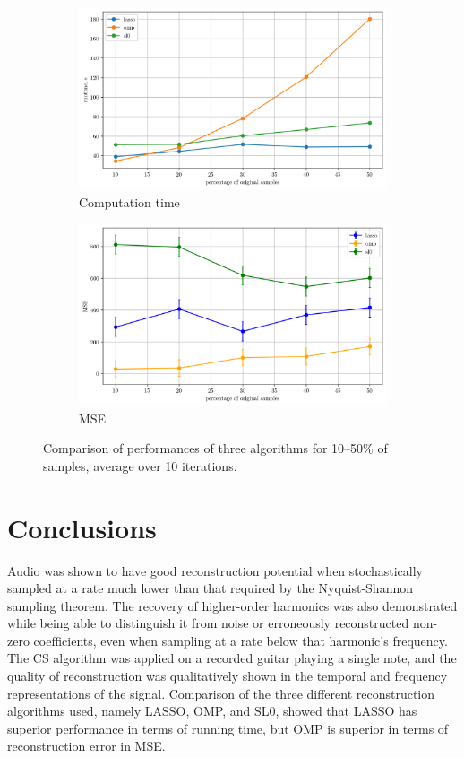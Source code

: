 \documentclass[10pt,a4paper,twoside]{article}
\begin{document}
\begin{figure}[!htb]
	\centering
	\begin{subfigure}{0.45\linewidth}
		\centering
		\includegraphics[width=\linewidth]{processtime.png}
		\caption{Computation time}
		\label{fig:process-time}
	\end{subfigure}
	\begin{subfigure}{0.45\linewidth}
		\centering
		\includegraphics[width=\linewidth]{mse.png}
		\caption{MSE}
		\label{fig:mse}
	\end{subfigure}
	\caption{Comparison of performances of three algorithms for 10--50\% of samples, average over 10 iterations.}
	\label{fig:comparison}
\end{figure}


\section{Conclusions}\label{sec:Conc}
Audio was shown to have good reconstruction potential when stochastically sampled at a rate much lower than that required by the Nyquist-Shannon sampling theorem. The recovery of higher-order harmonics was also demonstrated while being able to distinguish it from noise or erroneously reconstructed non-zero coefficients, even when sampling at a rate below that harmonic's frequency. The CS algorithm was applied on a recorded guitar playing a single note, and the quality of reconstruction was qualitatively shown in the temporal and frequency representations of the signal. Comparison of the three different reconstruction algorithms used, namely LASSO, OMP, and SL0, showed that LASSO has superior performance in terms of running time, but OMP is superior in terms of reconstruction error in MSE.
\end{document}
